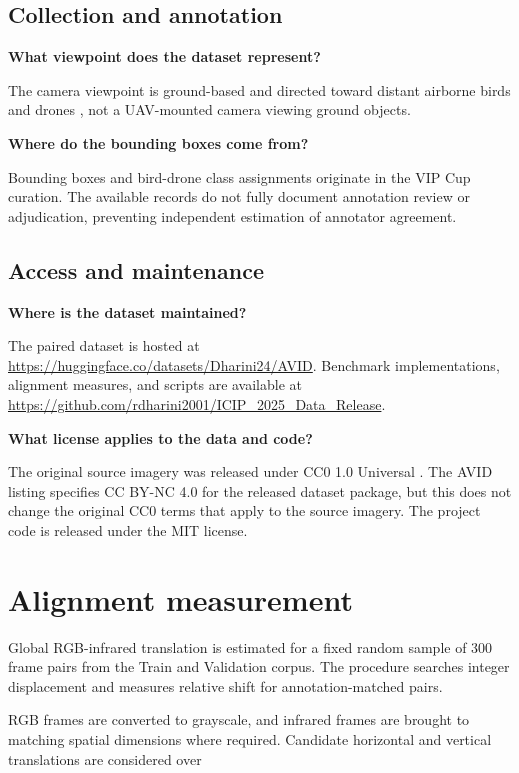 \documentclass[10pt]{article}
\newcommand{\dataset}{\textsc{AVID}}
\begin{document}
\subsection{Collection and annotation}

\textbf{What viewpoint does the dataset represent?}

The camera viewpoint is ground-based and directed toward distant airborne birds and drones \citep{svanstrom2021multisensor}, not a UAV-mounted camera viewing ground objects.

\textbf{Where do the bounding boxes come from?}

Bounding boxes and bird-drone class assignments originate in the VIP Cup curation. The available records do not fully document annotation review or adjudication, preventing independent estimation of annotator agreement.

\subsection{Access and maintenance}

\textbf{Where is the dataset maintained?}

The paired dataset is hosted at \url{https://huggingface.co/datasets/Dharini24/AVID}. Benchmark implementations, alignment measures, and scripts are available at \url{https://github.com/rdharini2001/ICIP_2025_Data_Release}.

\textbf{What license applies to the data and code?}

The original source imagery was released under CC0 1.0 Universal \citep{svanstrom2020repository}. The \dataset{} listing specifies CC BY-NC 4.0 for the released dataset package, but this does not change the original CC0 terms that apply to the source imagery. The project code is released under the MIT license.


\section{Alignment measurement}
\label{app:alignment}

Global RGB-infrared translation is estimated for a fixed random sample of 300 frame pairs from the Train and Validation corpus. The procedure searches integer displacement and measures relative shift for annotation-matched pairs.

RGB frames are converted to grayscale, and infrared frames are brought to matching spatial dimensions where required. Candidate horizontal and vertical translations are considered over
\end{document}

